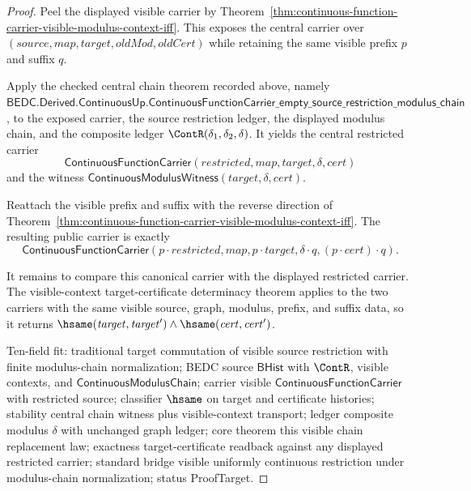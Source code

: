 \begin{proof}
Peel the displayed visible carrier by Theorem~\ref{thm:continuous-function-carrier-visible-modulus-context-iff}. This exposes the central carrier over $(\mathit{source},\mathit{map},\mathit{target},\mathit{oldMod},\mathit{oldCert})$ while retaining the same visible prefix $p$ and suffix $q$.

Apply the checked central chain theorem recorded above, namely $\mathsf{BEDC.Derived.ContinuousUp.ContinuousFunctionCarrier\_empty\_source\_restriction\_modulus\_chain}$, to the exposed carrier, the source restriction ledger, the displayed modulus chain, and the composite ledger $\ContR(\delta_1,\delta_2,\delta)$. It yields the central restricted carrier
$$
\mathsf{ContinuousFunctionCarrier}(\mathit{restricted},\mathit{map},\mathit{target},\delta,\mathit{cert})
$$
and the witness $\mathsf{ContinuousModulusWitness}(\mathit{target},\delta,\mathit{cert})$.

Reattach the visible prefix and suffix with the reverse direction of Theorem~\ref{thm:continuous-function-carrier-visible-modulus-context-iff}. The resulting public carrier is exactly
$$
\mathsf{ContinuousFunctionCarrier}(p\cdot \mathit{restricted},\mathit{map},p\cdot \mathit{target},
\delta\cdot q,(p\cdot \mathit{cert})\cdot q).
$$

It remains to compare this canonical carrier with the displayed restricted carrier. The visible-context target-certificate determinacy theorem applies to the two carriers with the same visible source, graph, modulus, prefix, and suffix data, so it returns $\hsame(\mathit{target},\mathit{target}')\land\hsame(\mathit{cert},\mathit{cert}')$.

Ten-field fit: traditional target commutation of visible source restriction with finite modulus-chain normalization; BEDC source $\mathsf{BHist}$ with $\ContR$, visible contexts, and $\mathsf{ContinuousModulusChain}$; carrier visible $\mathsf{ContinuousFunctionCarrier}$ with restricted source; classifier $\hsame$ on target and certificate histories; stability central chain witness plus visible-context transport; ledger composite modulus $\delta$ with unchanged graph ledger; core theorem this visible chain replacement law; exactness target-certificate readback against any displayed restricted carrier; standard bridge visible uniformly continuous restriction under modulus-chain normalization; status ProofTarget.
\end{proof}

